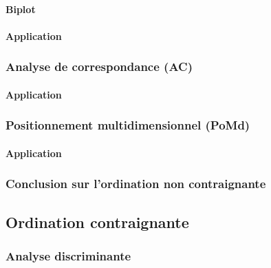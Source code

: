 \documentclass[]{book}
\let\oldparagraph\paragraph
\renewcommand{\paragraph}[1]{\oldparagraph{#1}\mbox{}}
\begin{document}
\hypertarget{biplot}{%
\paragraph{Biplot}\label{biplot}}

\hypertarget{application-3}{%
\paragraph{Application}\label{application-3}}

\hypertarget{analyse-de-correspondance-ac}{%
\subsubsection{Analyse de correspondance
(AC)}\label{analyse-de-correspondance-ac}}

\hypertarget{application-4}{%
\paragraph{Application}\label{application-4}}

\hypertarget{positionnement-multidimensionnel-pomd}{%
\subsubsection{Positionnement multidimensionnel
(PoMd)}\label{positionnement-multidimensionnel-pomd}}

\hypertarget{application-5}{%
\paragraph{Application}\label{application-5}}

\hypertarget{conclusion-sur-lordination-non-contraignante}{%
\subsubsection{Conclusion sur l'ordination non
contraignante}\label{conclusion-sur-lordination-non-contraignante}}

\hypertarget{ordination-contraignante}{%
\subsection{Ordination contraignante}\label{ordination-contraignante}}

\hypertarget{analyse-discriminante}{%
\subsubsection{Analyse discriminante}\label{analyse-discriminante}}
\end{document}
